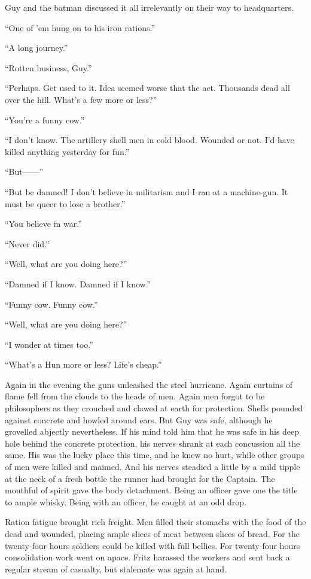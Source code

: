 Guy and the batman discussed it all irrelevantly on their way to headquarters.

``One of 'em hung on to his iron rations.''

``A long journey.''

``Rotten business, Guy.''

``Perhaps. Get used to it. Idea seemed worse that the act. Thousands dead all over the hill. What's a few more or less?''

``You're a funny cow.''

``I don't know. The artillery shell men in cold blood. Wounded or not. I'd have killed anything yesterday for fun.''

``But------''

``But be damned! I don't believe in militarism and I ran at a machine-gun. It must be queer to lose a brother.''

``You believe in war.''

``Never did.''

``Well, what are you doing here?''

``Damned if I know. Damned if I know.''

``Funny cow. Funny cow.''

``Well, what are you doing here?''

``I wonder at times too.''

``What's a Hun more or less? Life's cheap.''

Again in the evening the guns unleashed the steel hurricane. Again curtains of flame fell from the clouds to the heads of men. Again men forgot to be philosophers as they crouched and clawed at earth for protection. Shells pounded against concrete and howled around ears. But Guy was safe, although he grovelled abjectly nevertheless. If his mind told him that he was safe in his deep hole behind the concrete protection, his nerves shrank at each concussion all the same. His was the lucky place this time, and he knew no hurt, while other groups of men were killed and maimed. And his nerves steadied a little by a mild tipple at the neck of a fresh bottle the runner had brought for the Captain. The mouthful of spirit gave the body detachment. Being an officer gave one the title to ample whisky. Being with an officer, he caught at an odd drop.

Ration fatigue brought rich freight. Men filled their stomachs with the food of the dead and wounded, placing ample slices of meat between slices of bread. For the twenty-four hours soldiers could be killed with full bellies. For twenty-four hours consolidation work went on apace. Fritz harassed the workers and sent back a regular stream of casualty, but stalemate was again at hand.


